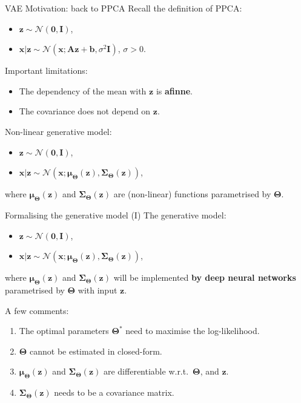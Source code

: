 \documentclass{beamer}
\newcommand{\MN}{{\mathcal N}}
\newcommand{\bs}[1]{\boldsymbol{#1}}
\begin{document}
\begin{frame}{VAE Motivation: back to PPCA}
 Recall the definition of PPCA:
 \begin{itemize}
  \item $\bs{z}\sim\mathcal{N}(\bs{0},\bs{I})$,
  \item $\bs{x}|\bs{z}\sim\MN(\bs{x};\bs{A}\bs{z}+\bs{b},\sigma^2\bs{I})$, $\sigma>0$.
 \end{itemize}\vspace{3mm}
 
 Important limitations:
 \begin{itemize}
  \item The dependency of the mean with $\bs{z}$ is \textbf{afinne}.
  \item The covariance does not depend on $\bs{z}$.
 \end{itemize}\vspace{3mm}
 
 Non-linear generative model:
 \begin{itemize}
  \item $\bs{z}\sim\mathcal{N}(\bs{0},\bs{I})$,
  \item $\bs{x}|\bs{z}\sim\MN(\bs{x};\bs{\mu}_{\bs{\Theta}}(\bs{z}),\bs{\Sigma}_{\bs{\Theta}}(\bs{z}))$,
 \end{itemize}
 where $\bs{\mu}_{\bs{\Theta}}(\bs{z})$ and $\bs{\Sigma}_{\bs{\Theta}}(\bs{z})$ are (non-linear) functions parametrised by $\bs{\Theta}$.
\end{frame}


\begin{frame}{Formalising the generative model (I)}
  The generative model:
 \begin{itemize}
  \item $\bs{z}\sim\mathcal{N}(\bs{0},\bs{I})$,
  \item $\bs{x}|\bs{z}\sim\MN(\bs{x};\bs{\mu}_{\bs{\Theta}}(\bs{z}),\bs{\Sigma}_{\bs{\Theta}}(\bs{z}))$,
 \end{itemize}
 where $\bs{\mu}_{\bs{\Theta}}(\bs{z})$ and $\bs{\Sigma}_{\bs{\Theta}}(\bs{z})$ will be implemented \textbf{by deep neural networks} parametrised by $\bs{\Theta}$ with input $\bs{z}$.\vspace{5mm}\pause
 
 A few comments:
 \begin{enumerate}
 \item The optimal parameters $\bs{\Theta}^*$ need to maximise the log-likelihood.
  \item $\bs{\Theta}$ cannot be estimated in closed-form.
  \item $\bs{\mu}_{\bs{\Theta}}(\bs{z})$ and $\bs{\Sigma}_{\bs{\Theta}}(\bs{z})$ are differentiable w.r.t.\ $\bs{\Theta}$, and $\bs{z}$.
  \item $\bs{\Sigma}_{\bs{\Theta}}(\bs{z})$ needs to be a covariance matrix.
 \end{enumerate}

\end{frame}
\end{document}
